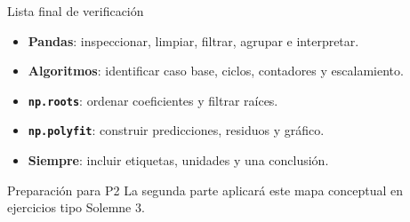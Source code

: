 \documentclass[10pt]{beamer}
\begin{document}
\begin{frame}{Lista final de verificación}
  \begin{itemize}
    \item \textbf{Pandas}: inspeccionar, limpiar, filtrar, agrupar e interpretar.
    \item \textbf{Algoritmos}: identificar caso base, ciclos, contadores y escalamiento.
    \item \textbf{\texttt{np.roots}}: ordenar coeficientes y filtrar raíces.
    \item \textbf{\texttt{np.polyfit}}: construir predicciones, residuos y gráfico.
    \item \textbf{Siempre}: incluir etiquetas, unidades y una conclusión.
  \end{itemize}

  \begin{alertblock}{Preparación para P2}
    La segunda parte aplicará este mapa conceptual en ejercicios tipo Solemne 3.
  \end{alertblock}
\end{frame}
\end{document}
